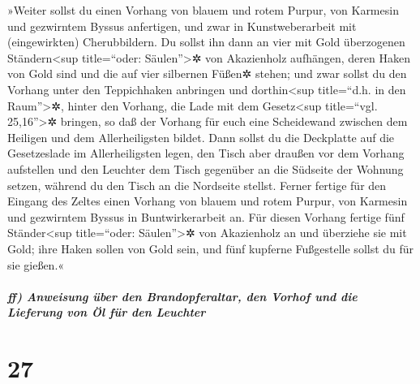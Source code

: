  »Weiter sollst du einen Vorhang von blauem und rotem
Purpur, von Karmesin und gezwirntem Byssus anfertigen, und zwar in
Kunstweberarbeit mit (eingewirkten) Cherubbildern.  Du
sollst ihn dann an vier mit Gold überzogenen Ständern\textless sup
title=``oder: Säulen''\textgreater✲ von Akazienholz aufhängen, deren
Haken von Gold sind und die auf vier silbernen Füßen✲ stehen;
 und zwar sollst du den Vorhang unter den Teppichhaken
anbringen und dorthin\textless sup title=``d.h. in den
Raum''\textgreater✲, hinter den Vorhang, die Lade mit dem
Gesetz\textless sup title=``vgl. 25,16''\textgreater✲ bringen, so daß
der Vorhang für euch eine Scheidewand zwischen dem Heiligen und dem
Allerheiligsten bildet.  Dann sollst du die Deckplatte
auf die Gesetzeslade im Allerheiligsten legen,  den Tisch
aber draußen vor dem Vorhang aufstellen und den Leuchter dem Tisch
gegenüber an die Südseite der Wohnung setzen, während du den Tisch an
die Nordseite stellst.  Ferner fertige für den Eingang
des Zeltes einen Vorhang von blauem und rotem Purpur, von Karmesin und
gezwirntem Byssus in Buntwirkerarbeit an.  Für diesen
Vorhang fertige fünf Ständer\textless sup title=``oder:
Säulen''\textgreater✲ von Akazienholz an und überziehe sie mit Gold;
ihre Haken sollen von Gold sein, und fünf kupferne Fußgestelle sollst du
für sie gießen.«

\hypertarget{ff-anweisung-uxfcber-den-brandopferaltar-den-vorhof-und-die-lieferung-von-uxf6l-fuxfcr-den-leuchter}{%
\subparagraph{ff) Anweisung über den Brandopferaltar, den Vorhof und die
Lieferung von Öl für den
Leuchter}\label{ff-anweisung-uxfcber-den-brandopferaltar-den-vorhof-und-die-lieferung-von-uxf6l-fuxfcr-den-leuchter}}

\hypertarget{section-26}{%
\section{27}\label{section-26}}

